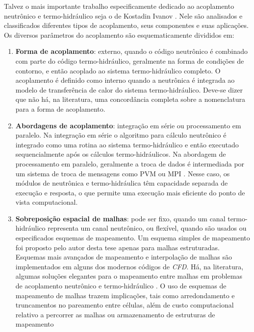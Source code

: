 Talvez o mais importante trabalho especificamente dedicado ao acoplamento 
neutrônico e termo-hidráulico seja o de Kostadin Ivanov \cite{Ivanov2007}. Nele são analisados e classificados diferentes tipos de 
acoplamento, seus componentes e suas aplicações. Os diversos parâmetros do acoplamento são esquematicamente divididos em: 
\begin{enumerate}
\item \textbf{Forma de acoplamento}: externo, quando o código neutrônico é combinado com parte do código termo-hidráulico, 
geralmente na forma de condições de contorno, e então acoplado ao sistema termo-hidráulico completo. O acoplamento 
é definido como interno quando a neutrônica é integrada ao modelo de transferência de calor do sistema termo-hidráulico. 
Deve-se dizer que não há, na literatura, uma
concordância completa sobre a nomenclatura para a forma de acoplamento. 
\item \textbf{Abordagens de acoplamento}: integração em série ou processamento em paralelo. Na integração em série o algoritmo 
para cálculo neutrônico é integrado como uma rotina ao sistema termo-hidráulico e então executado sequencialmente 
após os cálculos termo-hidráulicos. Na abordagem de processamento em paralelo, geralmente a troca de dados é 
intermediada por um sistema de troca de mensagens como PVM \cite{Geist94} ou MPI \cite{Quinn2004}. Nesse caso, os 
módulos de neutrônica e termo-hidráulica têm capacidade separada de execução e resposta, o que permite uma execução 
mais eficiente do ponto de vista computacional.
\item \textbf{Sobreposição espacial de malhas}: pode ser fixo, quando um canal termo-hidráulico representa um canal neutrônico, 
  ou flexível, quando são usados ou especificados esquemas de mapeamento. Um esquema simples de mapeamento foi proposto
  pelo autor desta tese \cite{Silva2015} apenas para malhas estruturadas. Esquemas mais avançados de mapeamento 
e interpolação de malhas \cite{Beaudoin2008} são implementados em alguns dos modernos códigos de \textit{CFD}.
Há, na literatura, algumas soluções elegantes para o mapeamento entre malhas em problemas de acoplamento neutrônico
e termo-hidráulico \cite{Jareteg2015, Richard2015, Schmidt2015}. O uso de esquemas de mapeamento de malhas trazem
implicações, tais como arredondamento e truncamentos no pareamento
entre células, além de custo computacional relativo a percorrer as malhas ou armazenamento de estruturas de mapeamento

\end{enumerate}
